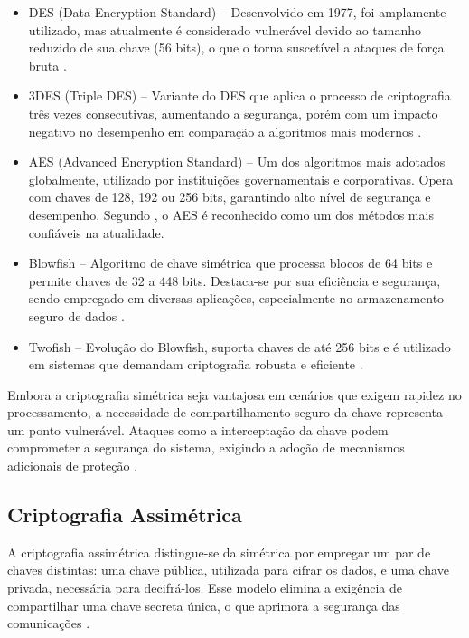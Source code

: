 \begin{itemize}
    \item DES (Data Encryption Standard) – Desenvolvido em 1977, foi amplamente utilizado, mas atualmente é considerado vulnerável devido ao tamanho reduzido de sua chave (56 bits), o que o torna suscetível a ataques de força bruta \cite{viana2022criptografia}.
    \item 3DES (Triple DES) – Variante do DES que aplica o processo de criptografia três vezes consecutivas, aumentando a segurança, porém com um impacto negativo no desempenho em comparação a algoritmos mais modernos \cite{viana2022criptografia}.
    \item AES (Advanced Encryption Standard) – Um dos algoritmos mais adotados globalmente, utilizado por instituições governamentais e corporativas. Opera com chaves de 128, 192 ou 256 bits, garantindo alto nível de segurança e desempenho. Segundo , o AES é reconhecido como um dos métodos mais confiáveis na atualidade.
    \item Blowfish – Algoritmo de chave simétrica que processa blocos de 64 bits e permite chaves de 32 a 448 bits. Destaca-se por sua eficiência e segurança, sendo empregado em diversas aplicações, especialmente no armazenamento seguro de dados \cite{viana2022criptografia}.
    \item Twofish – Evolução do Blowfish, suporta chaves de até 256 bits e é utilizado em sistemas que demandam criptografia robusta e eficiente \cite{viana2022criptografia}.
\end{itemize}

Embora a criptografia simétrica seja vantajosa em cenários que exigem rapidez no processamento, a necessidade de compartilhamento seguro da chave representa um ponto vulnerável. Ataques como a interceptação da chave podem comprometer a segurança do sistema, exigindo a adoção de mecanismos adicionais de proteção \cite{viana2022criptografia}.

\subsection{Criptografia Assimétrica}

A criptografia assimétrica distingue-se da simétrica por empregar um par de chaves distintas: uma chave pública, utilizada para cifrar os dados, e uma chave privada, necessária para decifrá-los. Esse modelo elimina a exigência de compartilhar uma chave secreta única, o que aprimora a segurança das comunicações \cite{viana2022criptografia}.

